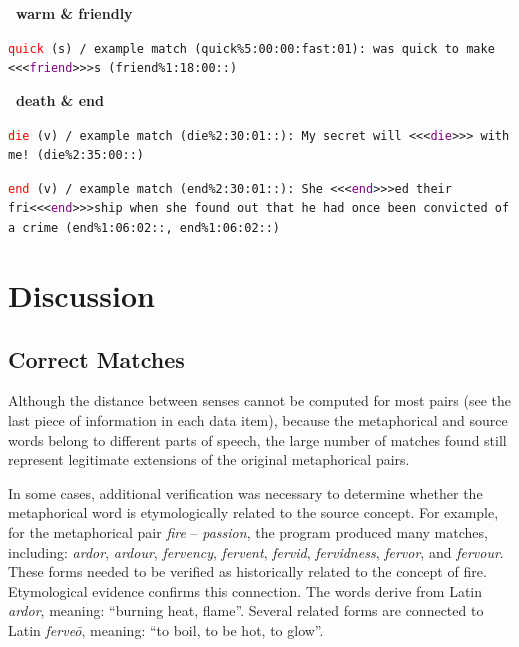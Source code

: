 \documentclass[12pt,a4paper]{article}
\begin{document}
{\noindent\textbf{\textbullet\ warm \& friendly}

\texttt{\textcolor{red}{quick} (s) / example match (quick\%5:00:00:fast:01): was quick to make <<<\textcolor{purple}{friend}>>>s (friend\%1:18:00::)}

\vspace{1em}

\noindent\textbf{\textbullet\ death \& end}

\texttt{\textcolor{red}{die} (v) / example match (die\%2:30:01::): My secret will <<<\textcolor{purple}{die}>>> with me! (die\%2:35:00::)}

\texttt{\textcolor{red}{end} (v) / example match (end\%2:30:01::): She <<<\textcolor{purple}{end}>>>ed their fri<<<\textcolor{purple}{end}>>>ship when she found out that he had once been convicted of a crime (end\%1:06:02::, end\%1:06:02::)}

}




\section{Discussion}
\label{sec:discussion}

\subsection*{Correct Matches}

Although the distance between senses cannot be computed for most pairs (see the last piece of information in each data item), because the metaphorical and source words belong to different parts of speech, the large number of matches found still represent legitimate extensions of the original metaphorical pairs.

In some cases, additional verification was necessary to determine whether the metaphorical word is etymologically related to the source concept. For example, for the metaphorical pair \textit{fire} -- \textit{passion}, the program produced many matches, including: \textit{ardor}, \textit{ardour}, \textit{fervency}, \textit{fervent}, \textit{fervid}, \textit{fervidness}, \textit{fervor}, and \textit{fervour}. These forms needed to be verified as historically related to the concept of fire. Etymological evidence confirms this connection. The words derive from Latin \textit{ardor}, meaning: “burning heat, flame”. Several related forms are connected to Latin \textit{ferve\=o}, meaning: “to boil, to be hot, to glow”.
\end{document}

